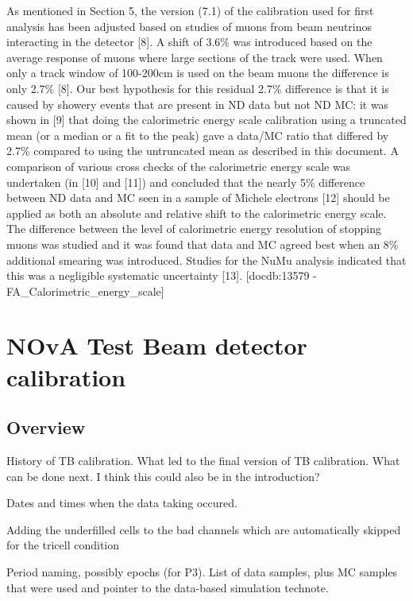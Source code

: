 \documentclass[12pt,a4paper]{article}
\begin{document}
As mentioned in Section 5, the version (7.1) of the calibration used for first analysis has been adjusted based on studies of muons from beam neutrinos interacting in the detector [8]. A shift of 3.6\% was introduced based on the average response of muons where large sections of the track were used. When only a track window of 100-200cm is used on the beam muons the difference is only 2.7\% [8]. Our best hypothesis for this residual 2.7\% difference is that it is caused by showery events that are present in ND data but not ND MC: it was shown in [9] that doing the calorimetric energy scale calibration using a truncated mean (or a median or a fit to the peak) gave a data/MC ratio that differed by 2.7\% compared to using the untruncated mean as described in this document. A comparison of various cross checks of the calorimetric energy scale was undertaken (in [10] and [11]) and concluded that the nearly 5\% difference between ND data and MC seen in a sample of Michele electrons [12] should be applied as both an absolute and relative shift to the calorimetric energy scale. The difference between the level of calorimetric energy resolution of stopping muons was studied and it was found that data and MC agreed best when an 8\% additional smearing was introduced. Studies for the NuMu analysis indicated that this was a negligible systematic uncertainty [13]. 
[docdb:13579 - FA\_Calorimetric\_energy\_scale]

\section{NOvA Test Beam detector calibration}
\subsection{Overview}
History of TB calibration. What led to the final version of TB calibration. What can be done next. I think this could also be in the introduction?

Dates and times when the data taking occured.

Adding the underfilled cells to the bad channels which are automatically skipped for the tricell condition

Period naming, possibly epochs (for P3).
List of data samples, plus MC samples that were used and pointer to the data-based simulation technote.
\end{document}
